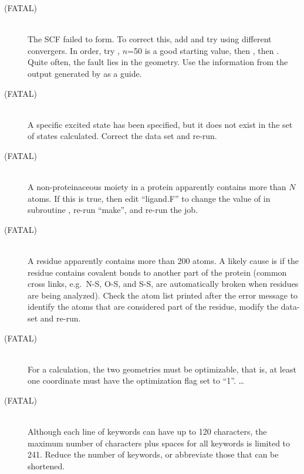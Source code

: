 \begin{description}
\item[ (FATAL)]~\\
The SCF failed to form.  To correct this, add  and try using
different convergers.  In order, try , $n$=50 is a good starting
value, then , then .  Quite often, the fault lies in the
geometry.  Use the information from the output generated by  as a
guide.
 
\item[ (FATAL)]~\\
A specific excited state has been specified, but it does not exist in the
set of states calculated.  Correct the data set and re-run.
 
\item[ (FATAL)]~\\
A non-proteinaceous moiety in a protein apparently contains more than $N$
atoms.  If this is true, then edit ``ligand.F'' to change the value of 
in subroutine , re-run ``make'', and re-run the job.

\item[ (FATAL)]~\\
A residue apparently contains more than 200 atoms.  A likely cause is if
the residue contains covalent bonds to another part of the protein (common
cross links, e.g.\ N-S, O-S, and S-S, are automatically broken when 
residues are being analyzed).  Check the atom list printed after the error
message to identify the atoms that are considered part of the residue,
modify the data-set and re-run.

\item[ (FATAL)]~\\
For a  calculation, the two geometries must be optimizable, 
that is, at least one coordinate must have the optimization flag set to ``1''.
 \ldots
{}
 
\item[ (FATAL)]~\\
Although each line of keywords can have up to 120 characters, 
the maximum number of characters plus spaces for all keywords is limited to 241.
Reduce the number of keywords, or abbreviate those that can be shortened.


\end{description}
